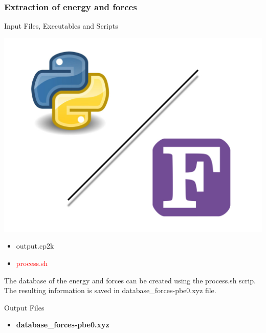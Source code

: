 \documentclass[12pt]{article}
\begin{document}
\subsubsection{Extraction of energy and forces}
\begin{mybox2}{{Input Files, Executables and Scripts}}
\begin{minipage}[c]{0.5\linewidth}
\includegraphics[scale=0.1]{latex_files/Python-fortran.jpeg}
\end{minipage}
\begin{minipage}[c]{0.5\linewidth}
\begin{itemize}
    \item output.cp2k
  \item \textcolor{red}{process.sh}
\end{itemize}
\end{minipage}
\end{mybox2}
The database of the energy and forces can be created using the process.sh scrip. The resulting information is saved in database\_forces-pbe0.xyz file.
\\
\begin{mybox3}{Output Files}
\begin{itemize}
    \item \textbf{database\_forces-pbe0.xyz}
\end{itemize}
\end{mybox3}
%
\end{document}
